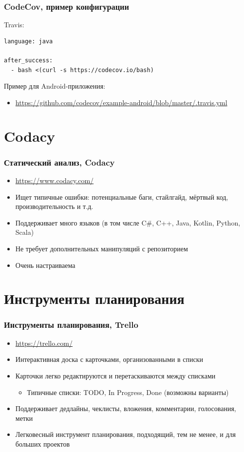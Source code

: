 \documentclass[xetex,mathserif,serif]{beamer}
\begin{document}
	\begin{frame}[fragile]
		\frametitle{CodeCov, пример конфигурации}
		Travis:
		\begin{verbatim}
language: java

after_success:
  - bash <(curl -s https://codecov.io/bash)
		\end{verbatim}
		Пример для Android-приложения:
		\begin{footnotesize}
			\begin{itemize}
				\item \url{https://github.com/codecov/example-android/blob/master/.travis.yml}
			\end{itemize}
		\end{footnotesize}
	\end{frame}

	\section{Codacy}

	\begin{frame}
		\frametitle{Статический анализ, Codacy}
		\begin{itemize}
			\item \url{https://www.codacy.com/}
			\item Ищет типичные ошибки: потенциальные баги, стайлгайд, мёртвый код, производительность и т.д.
			\item Поддерживает много языков (в том числе C\#, C++, Java, Kotlin, Python, Scala)
			\item Не требует дополнительных манипуляций с репозиторием
			\item Очень настраиваема
		\end{itemize}
	\end{frame}

	\section{Инструменты планирования}

	\begin{frame}
		\frametitle{Инструменты планирования, Trello}
		\begin{itemize}
			\item \url{https://trello.com/}
			\item Интерактивная доска с карточками, организованными в списки
			\item Карточки легко редактируются и перетаскиваются между списками
			\begin{itemize}
				\item Типичные списки: TODO, In Progress, Done (возможны варианты)
			\end{itemize}
			\item Поддерживает дедлайны, чеклисты, вложения, комментарии, голосования, метки
			\item Легковесный инструмент планирования, подходящий, тем не менее, и для больших проектов
		\end{itemize}
	\end{frame}
\end{document}
